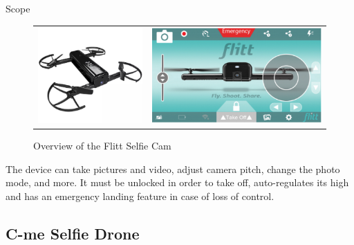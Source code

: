 \begin{chaptercover}{Scope}
\begin{figure}[H]
  \begin{tabular}{m{5cm}m{12.3cm}}
  \centering
  \includegraphics[width=\linewidth]{figures/flitt-selfie-cam} &
  \centering
  \includegraphics[width=0.63\linewidth]{figures/flitt-selfie-cam-ui} \\
  \end{tabular}
  \caption{Overview of the Flitt Selfie Cam}
  \label{fig:flitt-selfie-cam}
\end{figure}

The device can take pictures and video, adjust camera pitch, change the photo mode, and more. It must be unlocked in order to take off, auto-regulates its high and has an emergency landing feature in case of loss of control.

\subsection{C-me Selfie Drone}\label{subsec:cme-selfie-drone}


\end{chaptercover}
